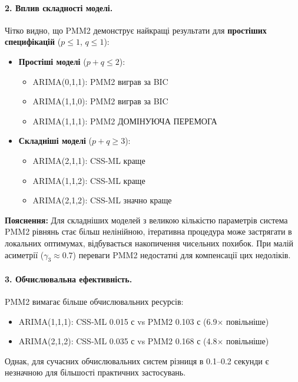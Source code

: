 \documentclass[12pt,a4paper]{article}
\begin{document}
\paragraph{2. Вплив складності моделі.}
Чітко видно, що PMM2 демонструє найкращі результати для \textbf{простіших специфікацій} ($p \leq 1$, $q \leq 1$):

\begin{itemize}
    \item \textbf{Простіші моделі} ($p+q \leq 2$):
    \begin{itemize}
        \item ARIMA(0,1,1): PMM2 виграв за BIC
        \item ARIMA(1,1,0): PMM2 виграв за BIC
        \item ARIMA(1,1,1): PMM2 ДОМІНУЮЧА ПЕРЕМОГА
    \end{itemize}

    \item \textbf{Складніші моделі} ($p+q \geq 3$):
    \begin{itemize}
        \item ARIMA(2,1,1): CSS-ML краще
        \item ARIMA(1,1,2): CSS-ML краще
        \item ARIMA(2,1,2): CSS-ML значно краще
    \end{itemize}
\end{itemize}

\noindent\textbf{Пояснення:} Для складніших моделей з великою кількістю параметрів система PMM2 рівнянь стає більш нелінійною, ітеративна процедура може застрягати в локальних оптимумах, відбувається накопичення чисельних похибок. При малій асиметрії ($\gamma_3 \approx 0.7$) переваги PMM2 недостатні для компенсації цих недоліків.

\paragraph{3. Обчислювальна ефективність.}
PMM2 вимагає більше обчислювальних ресурсів:
\begin{itemize}
    \item ARIMA(1,1,1): CSS-ML 0.015 с vs PMM2 0.103 с (6.9$\times$ повільніше)
    \item ARIMA(2,1,2): CSS-ML 0.035 с vs PMM2 0.168 с (4.8$\times$ повільніше)
\end{itemize}

Однак, для сучасних обчислювальних систем різниця в 0.1--0.2 секунди є незначною для більшості практичних застосувань.
\end{document}
